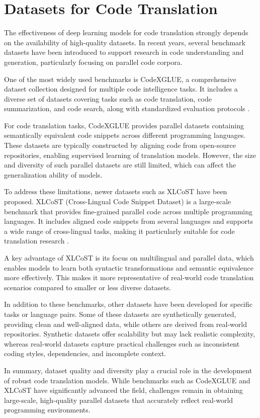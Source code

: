 \section{Datasets for Code Translation}


The effectiveness of deep learning models for code translation strongly depends
on the availability of high-quality datasets. In recent years, several benchmark
datasets have been introduced to support research in code understanding and
generation, particularly focusing on parallel code corpora.

One of the most widely used benchmarks is CodeXGLUE, a comprehensive dataset
collection designed for multiple code intelligence tasks. It includes a diverse
set of datasets covering tasks such as code translation, code summarization, and
code search, along with standardized evaluation protocols
\cite{lu2021codexglue}. 

For code translation tasks, CodeXGLUE provides parallel datasets containing
semantically equivalent code snippets across different programming languages.
These datasets are typically constructed by aligning code from open-source
repositories, enabling supervised learning of translation models. However, the
size and diversity of such parallel datasets are still limited, which can affect
the generalization ability of models.

To address these limitations, newer datasets such as XLCoST have been proposed.
XLCoST (Cross-Lingual Code Snippet Dataset) is a large-scale benchmark that
provides fine-grained parallel code across multiple programming languages. It
includes aligned code snippets from several languages and supports a wide range
of cross-lingual tasks, making it particularly suitable for code translation
research \cite{zhu2022xlcost}.

A key advantage of XLCoST is its focus on multilingual and parallel data, which
enables models to learn both syntactic transformations and semantic equivalence
more effectively. This makes it more representative of real-world code
translation scenarios compared to smaller or less diverse datasets.

In addition to these benchmarks, other datasets have been developed for specific
tasks or language pairs. Some of these datasets are synthetically generated,
providing clean and well-aligned data, while others are derived from real-world
repositories. Synthetic datasets offer scalability but may lack realistic
complexity, whereas real-world datasets capture practical challenges such as
inconsistent coding styles, dependencies, and incomplete context.

In summary, dataset quality and diversity play a crucial role in the development
of robust code translation models. While benchmarks such as CodeXGLUE and XLCoST
have significantly advanced the field, challenges remain in obtaining
large-scale, high-quality parallel datasets that accurately reflect real-world
programming environments.